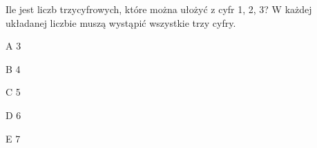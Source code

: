 \begin{tresc}
Ile jest liczb trzycyfrowych, które można ułożyć z cyfr 1, 2, 3? W każdej układanej liczbie muszą wystąpić wszystkie trzy cyfry.
\end{tresc}
\begin{wariant}{A} 3 \end{wariant}
\begin{wariant}{B} 4 \end{wariant}
\begin{wariant}{C} 5 \end{wariant}
\begin{wariant}{D} 6 \end{wariant}
\begin{wariant}{E} 7 \end{wariant}
